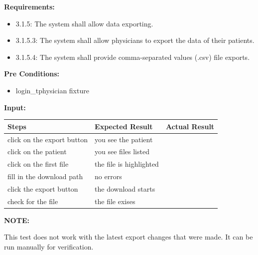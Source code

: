 \documentclass[letterpaper,10pt,english]{sphinxmanual}
\begin{document}
\begin{fulllineitems}
\label{STD/test_export:test_export.test_export_data_by_physician}
\textbf{Requirements:}
\begin{itemize}
\item {} 
3.1.5: The system shall allow data exporting.

\item {} 
3.1.5.3: The system shall allow physicians to export the data of their patients.

\item {} 
3.1.5.4: The system shall provide comma-separated values (.csv) file exports.

\end{itemize}

\textbf{Pre Conditions:}
\begin{itemize}
\item {} 
login\_tphysician fixture

\end{itemize}

\textbf{Input:}

\begin{tabulary}{\linewidth}{|L|L|L|}
\hline
\textsf{\relax 
Steps
} & \textsf{\relax 
Expected Result
} & \textsf{\relax 
Actual Result
}\\
\hline
click on the export button
 & 
you see the patient
 & \\
\hline
click on the patient
 & 
you see files listed
 & \\
\hline
click on the first file
 & 
the file is highlighted
 & \\
\hline
fill in the download path
 & 
no errors
 & \\
\hline
click the export button
 & 
the download starts
 & \\
\hline
check for the file
 & 
the file exises
 & \\
\hline\end{tabulary}


\textbf{NOTE:}

This test does not work with the latest export changes that were made. It can be run manually for verification.

\end{fulllineitems}

\end{document}
